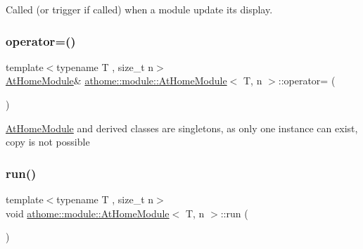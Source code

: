 Called (or trigger if called) when a module update its display. \mbox{\label{classathome_1_1module_1_1_at_home_module_aec07a48057f5d52c9adaea375a6a7ad4}} 
\subsubsection{\texorpdfstring{operator=()}{operator=()}}
{\footnotesize\ttfamily template$<$typename T , size\+\_\+t n$>$ \\
\mbox{\hyperlink{classathome_1_1module_1_1_at_home_module}{At\+Home\+Module}}\& \mbox{\hyperlink{classathome_1_1module_1_1_at_home_module}{athome\+::module\+::\+At\+Home\+Module}}$<$ T, n $>$\+::operator= (\begin{DoxyParamCaption}\item[{const \mbox{\hyperlink{classathome_1_1module_1_1_at_home_module}{At\+Home\+Module}}$<$ T, n $>$ \&}]{ }\end{DoxyParamCaption})\hspace{0.3cm}{\ttfamily [delete]}}

\mbox{\hyperlink{classathome_1_1module_1_1_at_home_module}{At\+Home\+Module}} and derived classes are singletons, as only one instance can exist, copy is not possible \mbox{\label{classathome_1_1module_1_1_at_home_module_ac39915bf4a255e3610515bc18af3029d}} 
\subsubsection{\texorpdfstring{run()}{run()}}
{\footnotesize\ttfamily template$<$typename T , size\+\_\+t n$>$ \\
void \mbox{\hyperlink{classathome_1_1module_1_1_at_home_module}{athome\+::module\+::\+At\+Home\+Module}}$<$ T, n $>$\+::run (\begin{DoxyParamCaption}{ }\end{DoxyParamCaption})\hspace{0.3cm}{\ttfamily [inline]}}


